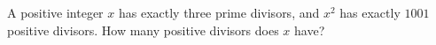 A positive integer $x$ has exactly three prime divisors, and $x^2$ has exactly $1001$ positive divisors. How many positive divisors does $x$ have?
